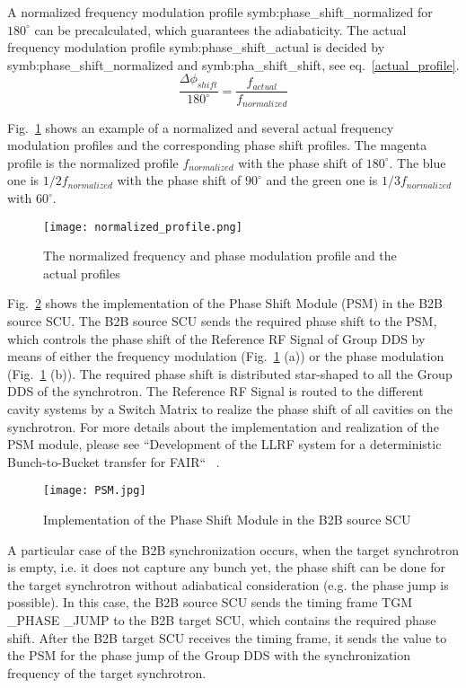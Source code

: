 \begin{itemize}
A normalized frequency modulation profile \gls{symb:phase_shift_normalized} for $180^\circ$ can be precalculated, which guarantees the adiabaticity. The actual frequency modulation profile \gls{symb:phase_shift_actual} is decided by \gls{symb:phase_shift_normalized} and \gls{symb:pha_shift_shift}, see eq.~\ref{actual_profile}. 
\begin{equation}
\frac{\Delta \phi_\mathit{shift}}{180^\circ}= \frac{f_{\mathit{actual}}}{f_{\mathit{normalized}}} \label{actual_profile}
\end{equation}

Fig.~\ref{normalized_profile} shows an example of a normalized and several actual frequency  modulation profiles and the corresponding phase shift profiles. The magenta profile is the normalized profile $f_{normalized}$ with the phase shift of $180^\circ$. The blue one is $1/2 f_{\mathit{normalized}}$ with the phase shift of $90^\circ$ and the green one is $1/3 f_{\mathit{normalized}}$ with $60^\circ$. 

\begin{figure}[!htb]
   \centering   
   \texttt{[image: normalized\_profile.png]}
   \caption{The normalized frequency and phase modulation profile and the actual profiles}
   \label{normalized_profile}
\end{figure}  

Fig.~\ref{PSM} shows the implementation of the Phase Shift Module (PSM) in the B2B source SCU. The B2B source SCU sends the required phase shift to the \gls{PSM}, which controls the phase shift of the Reference RF Signal of Group DDS by means of either the frequency modulation (Fig.~\ref{normalized_profile} (a)) or the phase modulation (Fig.~\ref{normalized_profile} (b)). The required phase shift is distributed star-shaped to all the Group DDS of the synchrotron. The Reference RF Signal is routed to the different cavity systems by a Switch Matrix to realize the phase shift of all cavities on the synchrotron. For more details about the implementation and realization of the PSM module, please see ``Development of the LLRF system for a deterministic Bunch-to-Bucket transfer for FAIR`` ~\cite{ferrand_development_????}.
  \begin{figure}[!htb]
   \centering   
   \texttt{[image: PSM.jpg]}
   \caption{Implementation of the Phase Shift Module in the B2B source SCU}
   \label{PSM}
\end{figure}                     


A particular case of the B2B synchronization occurs, when the target synchrotron is empty, i.e. it does not capture any bunch yet, the phase shift can be done for the target synchrotron without adiabatical consideration (e.g. the phase jump is possible). In this case, the B2B source SCU sends the timing frame TGM \_PHASE \_JUMP to the B2B target SCU, which contains the required phase shift. After the B2B target SCU receives the timing frame, it sends the value to the PSM for the phase jump of the Group DDS with the synchronization frequency of the target synchrotron.


\end{itemize}
